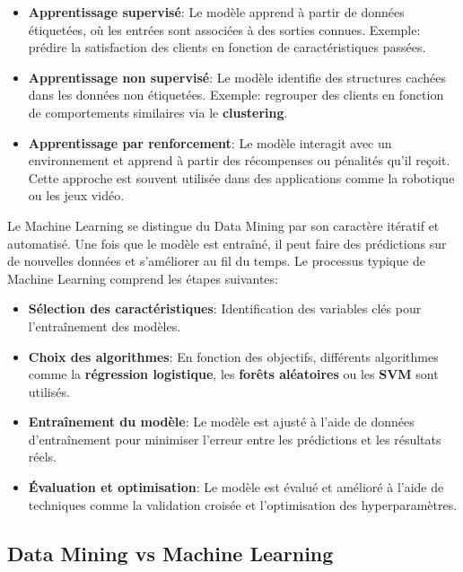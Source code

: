 \begin{itemize}
    \item \textbf{Apprentissage supervisé}: Le modèle apprend à partir de données étiquetées, où les entrées sont associées à des sorties connues. Exemple: prédire la satisfaction des clients en fonction de caractéristiques passées.
    \item \textbf{Apprentissage non supervisé}: Le modèle identifie des structures cachées dans les données non étiquetées. Exemple: regrouper des clients en fonction de comportements similaires via le \textbf{clustering}.
    \item \textbf{Apprentissage par renforcement}: Le modèle interagit avec un environnement et apprend à partir des récompenses ou pénalités qu'il reçoit. Cette approche est souvent utilisée dans des applications comme la robotique ou les jeux vidéo.
\end{itemize}

Le Machine Learning se distingue du Data Mining par son caractère itératif et automatisé. Une fois que le modèle est entraîné, il peut faire des prédictions sur de nouvelles données et s'améliorer au fil du temps. Le processus typique de Machine Learning comprend les étapes suivantes:

\begin{itemize}
    \item \textbf{Sélection des caractéristiques}: Identification des variables clés pour l'entraînement des modèles.
    \item \textbf{Choix des algorithmes}: En fonction des objectifs, différents algorithmes comme la \textbf{régression logistique}, les \textbf{forêts aléatoires} ou les \textbf{SVM} sont utilisés.
    \item \textbf{Entraînement du modèle}: Le modèle est ajusté à l'aide de données d'entraînement pour minimiser l'erreur entre les prédictions et les résultats réels.
    \item \textbf{Évaluation et optimisation}: Le modèle est évalué et amélioré à l'aide de techniques comme la validation croisée et l'optimisation des hyperparamètres.
\end{itemize}

\subsection{Data Mining vs Machine Learning}

